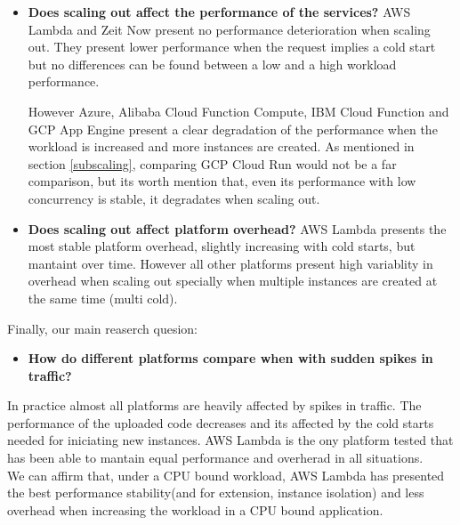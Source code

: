 \documentclass[11pt]{article}
\begin{document}
\begin{itemize}

\item \textbf{Does scaling out affect the performance of the services?} AWS Lambda and Zeit Now present no performance deterioration when scaling out. They present lower performance when the request implies a cold start but no differences can be found between a low and a high workload performance.

However Azure, Alibaba Cloud Function Compute, IBM Cloud Function and GCP App Engine present a clear degradation of the performance when the workload is increased and more instances are created. As mentioned in section \ref{subscaling}, comparing GCP Cloud Run would not be a far comparison, but its worth mention that, even its performance with low concurrency is stable, it degradates when scaling out.

\item \textbf{Does scaling out affect platform overhead?} AWS Lambda presents the most stable platform overhead, slightly increasing with cold starts, but mantaint over time. However all other platforms present high variablity in overhead when scaling out specially when multiple instances are created at the same time (multi cold).

\end{itemize}

Finally, our main reaserch quesion:

\begin{itemize}
\item \textbf{How do different platforms compare when with sudden spikes in traffic?}
\end{itemize}
In practice almost all platforms are heavily affected by spikes in traffic. The performance of the uploaded code decreases and its affected by the cold starts needed for iniciating new instances. AWS Lambda is the ony platform tested that has been able to mantain equal performance and overherad in all situations.  \\


We can affirm that, under a CPU bound workload, AWS Lambda has presented the best performance stability(and for extension, instance isolation) and less overhead when increasing the workload in a CPU bound application.




\end{document}
